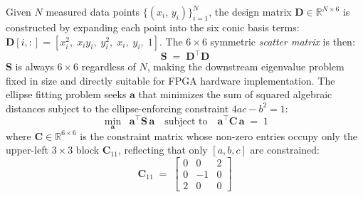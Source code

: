 \documentclass[colorlinks,upint,subscriptcorrection,varvw,hyphenate,balance,greek,russian,vietnamese,german]{asmeconf} %
\begin{document}
Given $N$ measured data points $\{(x_i,\,y_i)\}_{i=1}^{N}$,
the design matrix $\mathbf{D} \in \mathbb{R}^{N \times 6}$ is
constructed by expanding each point into the six conic basis terms:
$\mathbf{D}[i,:] = [x_i^2,\; x_iy_i,\; y_i^2,\; x_i,\; y_i,\; 1]$.
The $6\times6$ symmetric \emph{scatter matrix} is then:
\begin{equation}
	\mathbf{S} \;=\; \mathbf{D}^\top \mathbf{D}
	\label{eq:scatter}
\end{equation}
$\mathbf{S}$ is always $6\times6$ regardless of $N$,
making the downstream eigenvalue problem fixed in size
and directly suitable for FPGA hardware implementation.
The ellipse fitting problem seeks $\mathbf{a}$ that minimizes
the sum of squared algebraic distances subject to the
ellipse-enforcing constraint $4ac - b^2 = 1$:
\begin{equation}
	\min_{\mathbf{a}} \;\;
	\mathbf{a}^\top \mathbf{S}\, \mathbf{a}
	\quad \text{subject to} \quad
	\mathbf{a}^\top \mathbf{C}\, \mathbf{a} \;=\; 1
	\label{eq:constrained}
\end{equation}
where $\mathbf{C} \in \mathbb{R}^{6\times6}$ is the constraint matrix
whose non-zero entries occupy only the upper-left $3\times3$ block
$\mathbf{C}_{11}$, reflecting that only $[a,b,c]$ are constrained:
\begin{equation}
	\mathbf{C}_{11} \;=\;
	\begin{bmatrix}
		0 & 0 & 2 \\
		0 & -1 & 0 \\
		2 & 0 & 0
	\end{bmatrix}
	\label{eq:C11}
\end{equation}
\end{document}
